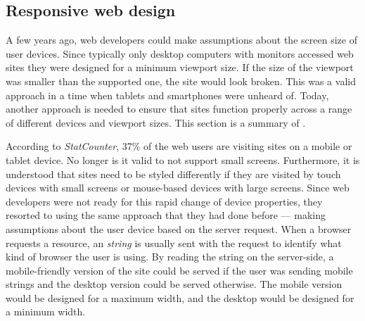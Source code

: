 \documentclass[a4paper,11pt]{kth-mag}
\begin{document}
      \subsection{Responsive web design}\label{sec:rwd}
        A few years ago, \gls{web} developers could make assumptions about the screen size of user devices.
        Since typically only desktop computers with monitors accessed \gls{web} sites they were designed for a minimum \gls{viewport} size.
        If the size of the \gls{viewport} was smaller than the supported one, the site would look broken.
        This was a valid approach in a time when tablets and smartphones were unheard of.
        Today, another approach is needed to ensure that sites function properly across a range of different devices and \gls{viewport} sizes.
        This section is a summary of .

        According to \emph{\gls{StatCounter}}, 37\% of the \gls{web} users are visiting sites on a mobile or tablet device.
        No longer is it valid to not support small screens.
        Furthermore, it is understood that sites need to be styled differently if they are visited by touch devices with small screens or mouse-based devices with large screens.
        Since \gls{web} developers were not ready for this rapid change of device properties, they resorted to using the same approach that they had done before --- making assumptions about the user device based on the server request.
        When a \gls{browser} requests a resource, an \emph{ string} is usually sent with the request to identify what kind of \gls{browser} the user is using. 
        By reading the  string on the server-side, a mobile-friendly version of the site could be served if the user was sending mobile  strings and the desktop version could be served otherwise.
        The mobile version would be designed for a maximum width, and the desktop would be designed for a minimum width.
        
\end{document}
